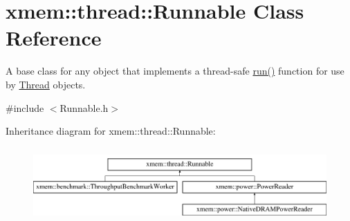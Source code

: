 \hypertarget{classxmem_1_1thread_1_1_runnable}{}\section{xmem\+:\+:thread\+:\+:Runnable Class Reference}
\label{classxmem_1_1thread_1_1_runnable}


A base class for any object that implements a thread-\/safe \hyperlink{classxmem_1_1thread_1_1_runnable_af2915224b03db20403550291672733a7}{run()} function for use by \hyperlink{classxmem_1_1thread_1_1_thread}{Thread} objects.  




{\ttfamily \#include $<$Runnable.\+h$>$}

Inheritance diagram for xmem\+:\+:thread\+:\+:Runnable\+:\begin{figure}[H]
\begin{center}
\leavevmode
\includegraphics[height=2.866894cm]{classxmem_1_1thread_1_1_runnable}
\end{center}
\end{figure}
